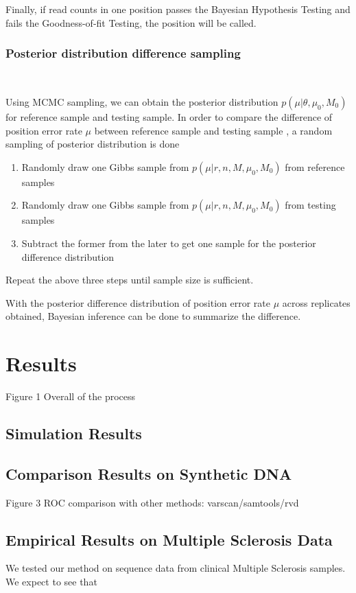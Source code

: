 \documentclass[11pt,reqno]{amsart}
\begin{document}
Finally, if read counts in one position passes the Bayesian Hypothesis Testing and fails the Goodness-of-fit Testing, the position will be called.


\subsubsection{Posterior distribution difference sampling}\

Using MCMC sampling, we can obtain the posterior distribution $p \left( \mu |\theta,\mu_0,M_0\right)$ for reference sample and testing sample. In order to compare the difference of position error rate $\mu$ between reference sample and testing sample , a random sampling of posterior distribution is done 

\begin{enumerate}
 \item Randomly  draw one Gibbs sample from $p \left( \mu |r, n, M, \mu_0, M_0\right)$ from reference samples
 \item Randomly draw one Gibbs sample from $p \left( \mu |r, n, M, \mu_0,M_0\right) $ from testing samples
 \item Subtract the former from the later to get one sample for the posterior difference distribution 
\end{enumerate}
Repeat the above three steps until sample size is sufficient.

With the posterior difference distribution of position error rate $\mu$ across replicates obtained, Bayesian inference can be done to summarize the difference. 


\section{Results}
Figure 1 Overall of the process
\subsection{Simulation Results}
\subsection{Comparison Results on Synthetic DNA}
Figure 3 ROC comparison with other methods: varscan/samtools/rvd
\subsection{Empirical Results on Multiple Sclerosis Data}
We tested our method on sequence data from clinical Multiple Sclerosis samples. We expect to see that 
\end{document}
